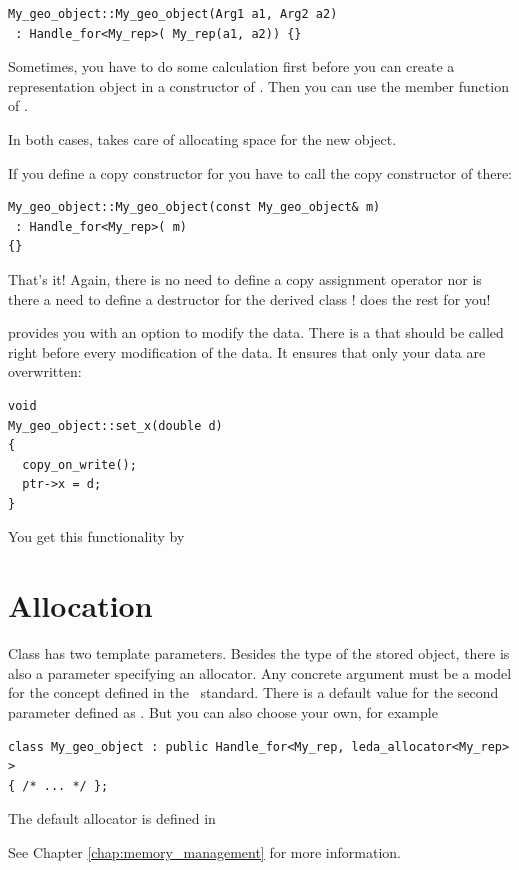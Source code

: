 \begin{verbatim}
My_geo_object::My_geo_object(Arg1 a1, Arg2 a2)
 : Handle_for<My_rep>( My_rep(a1, a2)) {}
\end{verbatim}

Sometimes, you have to do some calculation first before you can
create a representation object in a constructor of .
\def\ccIndexClassName{Handle_for}
Then you can use the %
 member function
of . 

In both cases,  takes care of allocating space for
the new object. 

If you define a copy constructor for  
you have to call the copy constructor of  there:

\begin{verbatim}
My_geo_object::My_geo_object(const My_geo_object& m)
 : Handle_for<My_rep>( m) 
{}
\end{verbatim}

That's it! Again, there is no need to define a copy assignment operator 
nor is there a need to define a destructor for the derived class 
!   does the rest for you!

 provides you with an option to modify the data. There is
a  
that should be called right before every modification of the data. 
It ensures that only your data are overwritten: 

\begin{verbatim}
void 
My_geo_object::set_x(double d)
{
  copy_on_write();
  ptr->x = d;
}
\end{verbatim}
You get this functionality by


\section{Allocation}
Class  has two template parameters. Besides the
type of the stored object, there is also a parameter specifying an
allocator.
Any concrete argument must be a model for the  concept
defined in the \CC\ standard. There is a default value for the second
parameter defined as . But you can also choose your
own, for example

\begin{verbatim}
class My_geo_object : public Handle_for<My_rep, leda_allocator<My_rep> > 
{ /* ... */ };
\end{verbatim}

The default allocator is defined in


See Chapter \ref{chap:memory_management} for more information.

